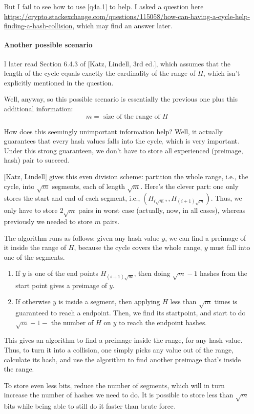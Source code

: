 \documentclass{6160}
\begin{document}
But I fail to see how to use \eqref{q4a.1} to help. I asked a question here 
\url{https://crypto.stackexchange.com/questions/115058/how-can-having-a-cycle-help-finding-a-hash-collision},
which may find an answer later.

\paragraph{Another possible scenario}
I later read Section 6.4.3 of [Katz, Lindell, 3rd ed.], which assumes that the
length of the cycle equals exactly the cardinality of the range of $H$, which
isn't explicitly mentioned in the question.

Well, anyway, so this possible scenario is essentially the previous one plus
this additional information:
\begin{equation}
	m = \text{ size of the range of } H
\end{equation}

How does this seemingly unimportant information help? Well, it actually
guarantees that every hash values falls into the cycle, which is very important.
Under this strong guaranteen, we don't have to store all experienced (preimage,
hash) pair to succeed.

[Katz, Lindell] gives this even division scheme: partition the whole range,
i.e., the cycle, into $\sqrt{m}$ segments, each of length $\sqrt{m}$. Here's the
clever part: one only stores the start and end of each segment, i.e.,
$(H_{i\sqrt{m}},, H_{(i+1)\sqrt{m}})$. Thus, we only have to store $2\sqrt{m}$
pairs in worst case (actually, now, in all cases), whereas previously we needed
to store $m$ pairs.

The algorithm runs as follows: given any hash value $y$, we can find a preimage
of it inside the range of $H$, because the cycle covers the whole range, $y$
must fall into one of the segments. 
\begin{enumerate}
\item If $y$ is one of the end points $H_{(i+1)\sqrt{m}}$, then doing
	$\sqrt{m}-1$ hashes from the start point gives a preimage of $y$.
\item If otherwise $y$ is inside a segment, then applying $H$ less than
	$\sqrt{m}$ times is guaranteed to reach a endpoint. Then, we find its
	startpoint, and start to do $\sqrt{m} - 1 - $ the number of $H$ on $y$ to
	reach the endpoint hashes.
\end{enumerate}

This gives an algorithm to find a preimage inside the range, for any hash value.
Thus, to turn it into a collision, one simply picks any value out of the range,
calculate its hash, and use the algorithm to find another preimage that's inside
the range.

To store even less bits, reduce the number of segments, which will in turn
increase the number of hashes we need to do. It is possible to store less than
$\sqrt{m}$ bits while being able to still do it faster than brute force.
\end{document}
